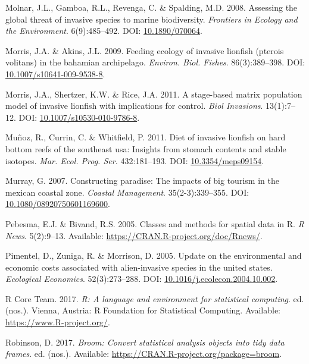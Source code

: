 \documentclass[12pt,]{article}
\begin{document}
\hypertarget{ref-molnar_2008}{}
Molnar, J.L., Gamboa, R.L., Revenga, C. \& Spalding, M.D. 2008.
Assessing the global threat of invasive species to marine biodiversity.
\emph{Frontiers in Ecology and the Environment}. 6(9):485--492. DOI:
\href{https://doi.org/10.1890/070064}{10.1890/070064}.

\hypertarget{ref-morris_2009}{}
Morris, J.A. \& Akins, J.L. 2009. Feeding ecology of invasive lionfish
(pterois volitans) in the bahamian archipelago. \emph{Environ. Biol.
Fishes}. 86(3):389--398. DOI:
\href{https://doi.org/10.1007/s10641-009-9538-8}{10.1007/s10641-009-9538-8}.

\hypertarget{ref-morris_2011}{}
Morris, J.A., Shertzer, K.W. \& Rice, J.A. 2011. A stage-based matrix
population model of invasive lionfish with implications for control.
\emph{Biol Invasions}. 13(1):7--12. DOI:
\href{https://doi.org/10.1007/s10530-010-9786-8}{10.1007/s10530-010-9786-8}.

\hypertarget{ref-muoz_2011}{}
Muñoz, R., Currin, C. \& Whitfield, P. 2011. Diet of invasive lionfish
on hard bottom reefs of the southeast usa: Insights from stomach
contents and stable isotopes. \emph{Mar. Ecol. Prog. Ser.} 432:181--193.
DOI: \href{https://doi.org/10.3354/meps09154}{10.3354/meps09154}.

\hypertarget{ref-murray_2007}{}
Murray, G. 2007. Constructing paradise: The impacts of big tourism in
the mexican coastal zone. \emph{Coastal Management}. 35(2-3):339--355.
DOI:
\href{https://doi.org/10.1080/08920750601169600}{10.1080/08920750601169600}.

\hypertarget{ref-sp_2017}{}
Pebesma, E.J. \& Bivand, R.S. 2005. Classes and methods for spatial data
in R. \emph{R News}. 5(2):9--13. Available:
\url{https://CRAN.R-project.org/doc/Rnews/}.

\hypertarget{ref-pimentel_2005}{}
Pimentel, D., Zuniga, R. \& Morrison, D. 2005. Update on the
environmental and economic costs associated with alien-invasive species
in the united states. \emph{Ecological Economics}. 52(3):273--288. DOI:
\href{https://doi.org/10.1016/j.ecolecon.2004.10.002}{10.1016/j.ecolecon.2004.10.002}.

\hypertarget{ref-rcore_2017}{}
R Core Team. 2017. \emph{R: A language and environment for statistical
computing}. ed. (nos.). Vienna, Austria: R Foundation for Statistical
Computing. Available: \url{https://www.R-project.org/}.

\hypertarget{ref-broom_2017}{}
Robinson, D. 2017. \emph{Broom: Convert statistical analysis objects
into tidy data frames}. ed. (nos.). Available:
\url{https://CRAN.R-project.org/package=broom}.
\end{document}
